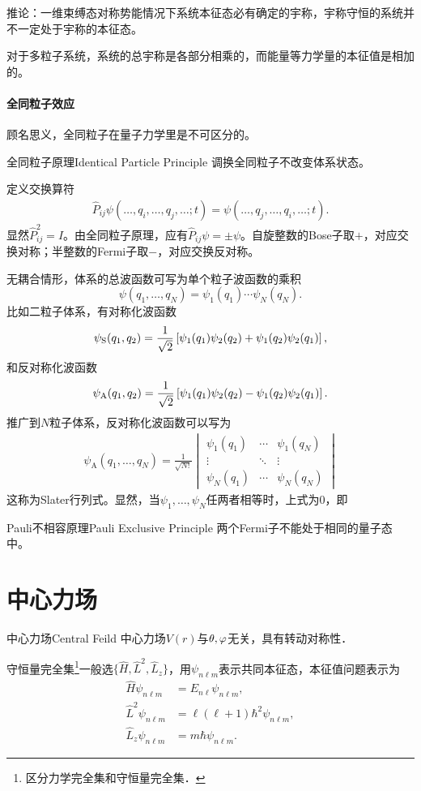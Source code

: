 推论：一维束缚态对称势能情况下系统本征态必有确定的宇称，宇称守恒的系统并不一定处于宇称的本征态。

对于多粒子系统，系统的总宇称是各部分相乘的，而能量等力学量的本征值是相加的。
\paragraph*{全同粒子效应}顾名思义，全同粒子在量子力学里是不可区分的。
\begin{theorem}{全同粒子原理}{Identical Particle Principle}
	调换全同粒子不改变体系状态。
\end{theorem}
定义交换算符
\begin{align}
	\hat P_{ij}\psi(\ldots,q_i,\ldots,q_j,\ldots;t)=\psi(\ldots,q_j,\ldots,q_i,\ldots;t).
\end{align}
显然$\hat P_{ij}^2=I$。由全同粒子原理，应有$\hat P_{ij}\psi=\pm\psi$。自旋整数的Bose子取$+$，对应交换对称；半整数的Fermi子取$-$，对应交换反对称。

无耦合情形，体系的总波函数可写为单个粒子波函数的乘积
\[
	\psi(q_1,\ldots,q_N)=\psi_1(q_1)\cdots\psi_N(q_N).
\]
比如二粒子体系，有对称化波函数
\[
	\psi_\mathrm S(q_1,q_2)=\frac1{\sqrt2}\left[\psi_1(q_1)\psi_2(q_2)+\psi_1(q_2)\psi_2(q_1)\right],
\]
和反对称化波函数
\[
	\psi_\mathrm A(q_1,q_2)=\frac1{\sqrt2}\left[\psi_1(q_1)\psi_2(q_2)-\psi_1(q_2)\psi_2(q_1)\right].
\]
推广到$N$粒子体系，反对称化波函数可以写为
\begin{align}
	\psi_\mathrm A(q_1,\ldots,q_N)=\frac1{\sqrt{N!}}\begin{vmatrix}
		\psi_1(q_1)&\cdots&\psi_1(q_N)\\
		\vdots&\ddots&\vdots\\
		\psi_N(q_1)&\cdots&\psi_N(q_N)
	\end{vmatrix}
\end{align}
这称为Slater行列式。显然，当$\psi_1,\ldots,\psi_N$任两者相等时，上式为0，即
\begin{theorem}{Pauli不相容原理}{Pauli Exclusive Principle}
	两个Fermi子不能处于相同的量子态中。
\end{theorem}
\clearpage
\section{中心力场}
\begin{definition}{中心力场}{Central Feild}
	中心力场$V(r)$与$\theta,\varphi$无关，具有转动对称性．
\end{definition}
守恒量完全集\footnote{区分力学完全集和守恒量完全集．}一般选$\{\hat H,\hat L^2,\hat L_z\}$，用$\psi_{n\ell m}$表示共同本征态，本征值问题表示为
\begin{align*}
	\hat H\psi_{n\ell m}   & =E_{n\ell}\psi_{n\ell m},           \\
	\hat L^2\psi_{n\ell m} & =\ell(\ell+1)\hbar^2\psi_{n\ell m}, \\
	\hat L_z\psi_{n\ell m} & =m\hbar\psi_{n\ell m}.
\end{align*}


